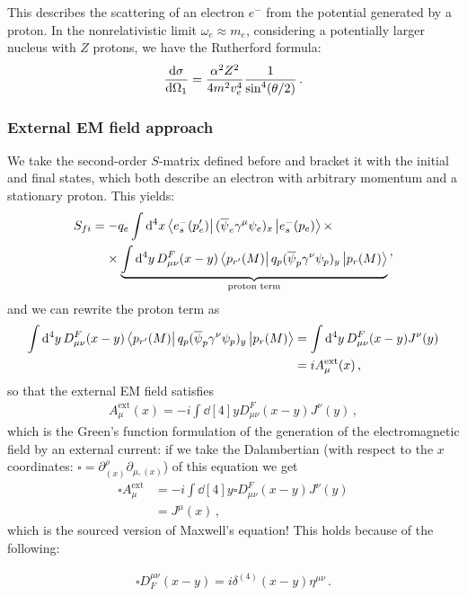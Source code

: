 \documentclass[main.tex]{subfiles}
\begin{document}
This describes the scattering of an electron \(e^{-}\) from the potential generated by a proton. In the nonrelativistic limit \(\omega_{e} \approx m_e\), considering a potentially larger nucleus with \(Z\) protons, we have the Rutherford formula: 
%
\begin{align}
\dv{\sigma }{\Omega_1} = \frac{\alpha^2Z^2}{4 m^2 v_e^{4}}
\frac{1}{\sin^{4} (\theta /2)}
\,.
\end{align}

\subsubsection{External EM field approach}

We take the second-order \(S\)-matrix defined before and bracket it with the initial and final states, which both describe an electron with arbitrary momentum and a stationary proton. This yields: 
%
\begin{align}
\begin{split}
S_{fi} &= - q_e \int \dd[4]{x}
\bra{e^{-}_{s} (p'_e)} 
(\overline{\psi}_{e} \gamma^{\mu} \psi_{e})_x 
\ket{e^{-}_{s}(p_e)} \times\\
&\phantom{=}\ \times
\underbrace{\int \dd[4]{y} D^{F}_{\mu \nu } (x-y) 
\bra{p_{r'} (M)} q_p  
(\overline{\psi}_{p} \gamma^{\nu} \psi_{p})_y 
\ket{p_r (M)}}_{\text{proton term}}
\end{split}
\,,
\end{align}
%
and we can rewrite the proton term as 
%
\begin{align}
\int \dd[4]{y} D^{F}_{\mu \nu } (x-y) 
\bra{p_{r'} (M)} q_p  
(\overline{\psi}_{p} \gamma^{\nu} \psi_{p})_y 
\ket{p_r (M)}
&= \int \dd[4]{y} D^{F}_{\mu \nu } (x-y) J^{\nu }(y)  \\
&= i A_{\mu }^{ \text{ext}}(x)
\,,
\end{align}
%
so that the external EM field satisfies 
%
\begin{align}
A_{\mu }^{ \text{ext}}(x)
=-i \int \dd[4]{y} D^{F}_{\mu \nu } (x-y) J^{\nu }(y)
\,,
\end{align}
%
which is the Green's function formulation of the generation of the electromagnetic field by an external current: if we take the Dalambertian (with respect to the \(x\) coordinates: \(\square = \partial^{\rho }_{(x)} \partial_{\mu, (x)}\)) of this equation we get 
%
\begin{align}
\square A^{\text{ext}}_{\mu } &= -i 
\int \dd[4]{y} \square D^{F}_{\mu \nu } (x-y) J^{\nu }(y)  \\
&= J^{\mu }(x)
\,,
\end{align}
%
which is the sourced version of Maxwell's equation! This holds because of the following: 
\begin{claim}
\begin{align}
\square D^{\mu \nu }_{F} (x-y) = i \delta^{(4)} (x-y) \eta^{\mu \nu }
\,.
\end{align}
\end{claim}
\end{document}
